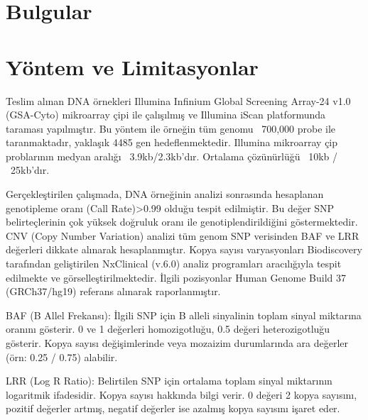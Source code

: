 \documentclass{article}
\begin{document}
\shorthandoff{=}


\section{Bulgular}

%

\section{Yöntem ve Limitasyonlar}

Teslim alınan DNA örnekleri Illumina Infinium Global Screening Array-24 v1.0 (GSA-Cyto) mikroarray çipi ile çalışılmış ve Illumina iScan platformunda taraması yapılmıştır. Bu yöntem ile örneğin tüm genomu ~700,000 probe ile taranmaktadır, yaklaşık 4485 gen hedeflenmektedir. Illumina mikroarray çip problarının medyan aralığı ~3.9kb/2.3kb’dır. Ortalama çözünürlüğü ~10kb / ~25kb’dır.

Gerçekleştirilen çalışmada, DNA örneğinin analizi sonrasında hesaplanan genotipleme oranı (Call Rate)>0.99 olduğu tespit edilmiştir. Bu değer SNP belirteçlerinin çok yüksek doğruluk oranı ile genotiplendirildiğini göstermektedir. CNV (Copy Number Variation) analizi tüm genom SNP verisinden BAF ve LRR değerleri dikkate alınarak hesaplanmıştır. Kopya sayısı varyasyonları Biodiscovery tarafından geliştirilen NxClinical (v.6.0) analiz programları aracılığıyla tespit edilmekte ve görselleştirilmektedir. İlgili pozisyonlar Human Genome Build 37 (GRCh37/hg19) referans alınarak raporlanmıştır.

BAF (B Allel Frekansı): İlgili SNP için B alleli sinyalinin toplam sinyal miktarına oranını gösterir. 0 ve 1 değerleri homozigotluğu, 0.5 değeri heterozigotluğu gösterir. Kopya sayısı değişimlerinde veya mozaizim durumlarında ara değerler (örn: 0.25 / 0.75) alabilir.

LRR (Log R Ratio): Belirtilen SNP için ortalama toplam sinyal miktarının logaritmik ifadesidir. Kopya sayısı hakkında bilgi verir. 0 değeri 2 kopya sayısını, pozitif değerler artmış, negatif değerler ise azalmış kopya sayısını işaret eder.
\end{document}
